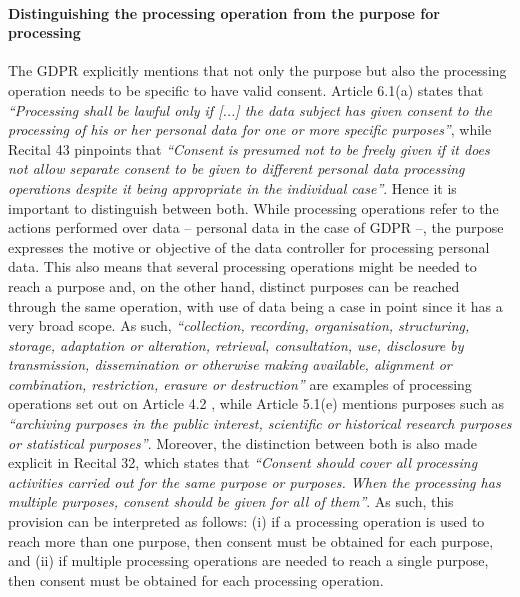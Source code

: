 \paragraph{Distinguishing the processing operation from the purpose for processing}

The GDPR explicitly mentions that not only the purpose but also the processing operation needs to be specific to have valid consent.
Article 6.1(a) \citeyearpar{noauthor_regulation_2016} states that \textit{``Processing shall be lawful only if [...] the data subject has given consent to the processing of his or her personal data for one or more specific purposes''}, while Recital 43 \citeyearpar{noauthor_regulation_2016} pinpoints that \textit{``Consent is presumed not to be freely given if it does not allow separate consent to be given to different personal data processing operations despite it being appropriate in the individual case''}.
Hence it is important to distinguish between both.
While processing operations refer to the actions performed over data -- personal data in the case of GDPR --, the purpose expresses the motive or objective of the data controller for processing personal data.
This also means that several processing operations might be needed to reach a purpose and, on the other hand, distinct purposes can be reached through the same operation, with use of data being a case in point since it has a very broad scope.
As such, \textit{``collection, recording, organisation, structuring, storage, adaptation or alteration, retrieval, consultation, use, disclosure by transmission, dissemination or otherwise making available, alignment or combination, restriction, erasure or destruction''} are examples of processing operations set out on Article 4.2 \citeyearpar{noauthor_regulation_2016}, while Article 5.1(e) \citeyearpar{noauthor_regulation_2016} mentions purposes such as \textit{``archiving purposes in the public interest, scientific or historical research purposes or statistical purposes''}.
Moreover, the distinction between both is also made explicit in Recital 32, which states that \textit{``Consent should cover all processing activities carried out for the same purpose or purposes. When the processing has multiple purposes, consent should be given for all of them''}.
As such, this provision can be interpreted as follows: (i) if a processing operation is used to reach more than one purpose, then consent must be obtained for each purpose, and (ii) if multiple processing operations are needed to reach a single purpose, then consent must be obtained for each processing operation.


